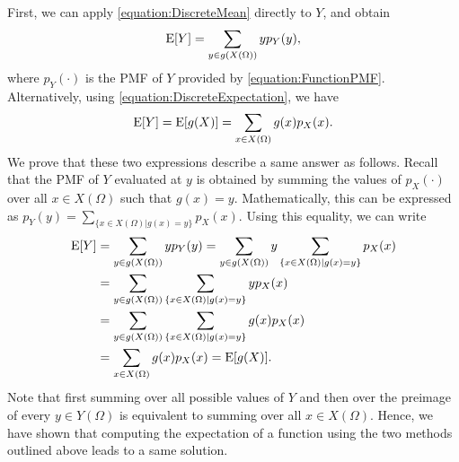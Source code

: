 First, we can apply \eqref{equation:DiscreteMean} directly to $Y$, and obtain
\begin{equation*}
\mathrm{E} [Y] = \sum_{y \in g(X(\Omega))} y p_Y(y),
\end{equation*}
where $p_Y (\cdot)$ is the PMF of $Y$ provided by \eqref{equation:FunctionPMF}.
Alternatively, using \eqref{equation:DiscreteExpectation}, we have
\begin{equation*}
\mathrm{E} [Y] = \mathrm{E} [g(X)] = \sum_{x \in X(\Omega)} g(x) p_X(x) .
\end{equation*}
We prove that these two expressions describe a same answer as follows.
Recall that the PMF of $Y$ evaluated at $y$ is obtained by summing the values of $p_X(\cdot)$ over all $x \in X(\Omega)$ such that $g(x) = y$.
Mathematically, this can be expressed as $p_Y (y) = \sum_{ \{x \in X(\Omega) | g(x) = y \} } p_X (x)$.
Using this equality, we can write
\begin{equation*}
\begin{split}
\mathrm{E} [Y] &= \sum_{y \in g(X(\Omega))} y p_Y(y)
= \sum_{y \in g(X(\Omega))} y
\sum_{\{x \in X(\Omega) | g(x) = y\}} p_X(x) \\
&= \sum_{y \in g(X(\Omega))}
\sum_{\{x \in X(\Omega) | g(x) = y\}} y p_X(x) \\
&= \sum_{y \in g(X(\Omega))}
\sum_{\{x \in X(\Omega) | g(x) = y\}} g(x) p_X(x) \\
&= \sum_{x \in X(\Omega)} g(x) p_X(x)
= \mathrm{E} [g(X)] .
\end{split}
\end{equation*}
Note that first summing over all possible values of $Y$ and then over the preimage of every $y \in Y(\Omega)$ is equivalent to summing over all $x \in X(\Omega)$.
Hence, we have shown that computing the expectation of a function using the two methods outlined above leads to a same solution.

